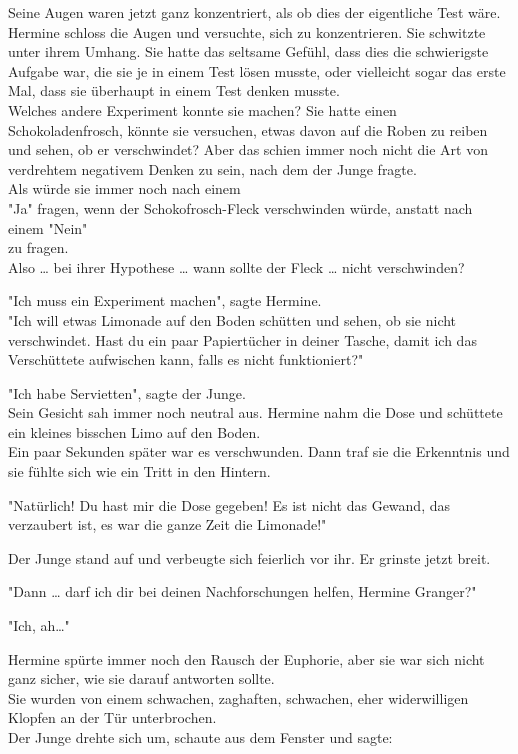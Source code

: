 {Seine Augen waren jetzt ganz konzentriert, als ob dies der eigentliche Test wäre.\\ Hermine schloss die Augen und versuchte, sich zu konzentrieren. Sie schwitzte unter ihrem Umhang. Sie hatte das seltsame Gefühl, dass dies die schwierigste Aufgabe war, die sie je in einem Test lösen musste, oder vielleicht sogar das erste Mal, dass sie überhaupt in einem Test denken musste.\\ Welches andere Experiment konnte sie machen? Sie hatte einen Schokoladenfrosch, könnte sie versuchen, etwas davon auf die Roben zu reiben und sehen, ob er verschwindet? Aber das schien immer noch nicht die Art von verdrehtem negativem Denken zu sein, nach dem der Junge fragte.\\ Als würde sie immer noch nach einem\\ "Ja" fragen, wenn der Schokofrosch-Fleck verschwinden würde, anstatt nach einem "Nein"\\ zu fragen.\\ Also … bei ihrer Hypothese … wann sollte der Fleck … nicht verschwinden?

"Ich muss ein Experiment machen", sagte Hermine.\\ "Ich will etwas Limonade auf den Boden schütten und sehen, ob sie nicht verschwindet. Hast du ein paar Papiertücher in deiner Tasche, damit ich das Verschüttete aufwischen kann, falls es nicht funktioniert?"

"Ich habe Servietten", sagte der Junge.\\ Sein Gesicht sah immer noch neutral aus. Hermine nahm die Dose und schüttete ein kleines bisschen Limo auf den Boden.\\ Ein paar Sekunden später war es verschwunden. Dann traf sie die Erkenntnis und sie fühlte sich wie ein Tritt in den Hintern.

"Natürlich! Du hast mir die Dose gegeben! Es ist nicht das Gewand, das verzaubert ist, es war die ganze Zeit die Limonade!"

Der Junge stand auf und verbeugte sich feierlich vor ihr. Er grinste jetzt breit.

"Dann … darf ich dir bei deinen Nachforschungen helfen, Hermine Granger?"

"Ich, ah…"

Hermine spürte immer noch den Rausch der Euphorie, aber sie war sich nicht ganz sicher, wie sie darauf antworten sollte.\\ Sie wurden von einem schwachen, zaghaften, schwachen, eher widerwilligen Klopfen an der Tür unterbrochen.\\ Der Junge drehte sich um, schaute aus dem Fenster und sagte:

}
